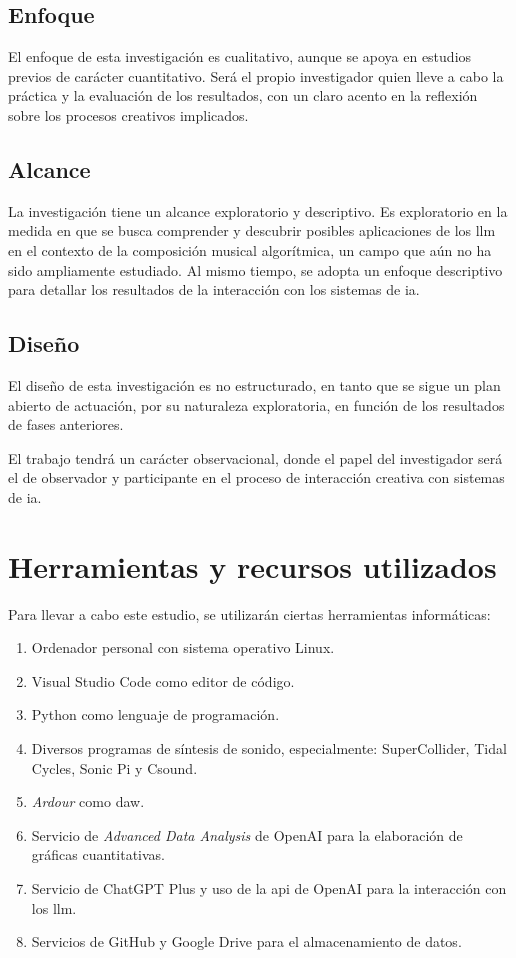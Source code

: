 \subsection{Enfoque}

El enfoque de esta investigación es {cualitativo}, aunque se apoya en estudios previos de carácter cuantitativo. Será el propio investigador quien lleve a cabo la práctica y la evaluación de los resultados, con un claro acento en la reflexión sobre los procesos creativos implicados.

\subsection{Alcance}
La investigación tiene un alcance {exploratorio} y {descriptivo}. Es exploratorio en la medida en que se busca comprender y descubrir posibles aplicaciones de los \gls{llm} en el contexto de la composición musical algorítmica, un campo que aún no ha sido ampliamente estudiado. Al mismo tiempo, se adopta un enfoque descriptivo para detallar los resultados de la interacción con los sistemas de \gls{ia}.


\subsection{Diseño}
El diseño de esta investigación es {no estructurado}, en tanto que se sigue un plan abierto de actuación, por su naturaleza exploratoria, en función de los resultados de fases anteriores.

El trabajo tendrá un carácter {observacional}, donde el papel del investigador será el de observador y participante en el proceso de interacción creativa con sistemas de \gls{ia}.

\section{Herramientas y recursos utilizados}

Para llevar a cabo este estudio, se utilizarán ciertas herramientas informáticas:

\begin{enumerate}
    \item Ordenador personal con sistema operativo Linux.
    \item Visual Studio Code como editor de código.
    \item Python como lenguaje de programación.
    \item Diversos programas de síntesis de sonido, especialmente: SuperCollider, Tidal Cycles, Sonic Pi y Csound.
    \item \emph{Ardour} como \gls{daw}.
    \item Servicio de \emph{Advanced Data Analysis} de OpenAI para la elaboración de gráficas cuantitativas.
    \item Servicio de ChatGPT Plus y uso de la \gls{api} de OpenAI para la interacción con los \gls{llm}.
    \item Servicios de GitHub y Google Drive para el almacenamiento de datos.
\end{enumerate}


